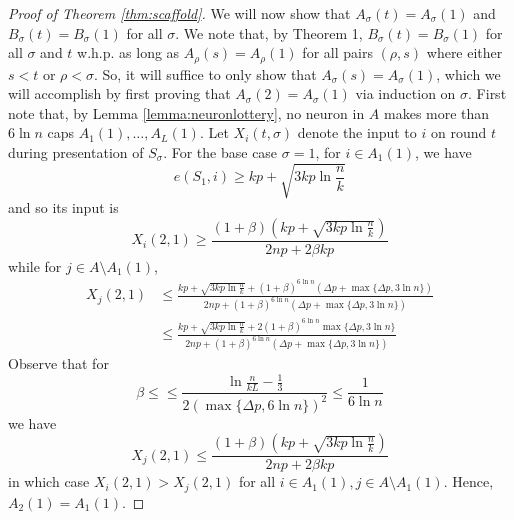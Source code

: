 \documentclass[12pt,nosubfloats]{alt2024} %
\newcommand{\1}{\mathbbm{1}}
\begin{document}
\begin{proof}[Proof of Theorem \ref{thm:scaffold}]
We will now show that $A_\sigma(t) = A_\sigma(1)$ and $B_\sigma(t) = B_\sigma(1)$ for all $\sigma$. We note that, by Theorem 1, $B_\sigma(t) = B_\sigma(1)$ for all $\sigma$ and $t$ w.h.p. as long as $A_\rho(s) = A_\rho(1)$ for all pairs $(\rho, s)$ where either $s < t$ or $\rho < \sigma$. So, it will suffice to only show that $A_\sigma(s) = A_\sigma(1)$, which we will accomplish by first proving that $A_\sigma(2) = A_\sigma(1)$ via induction on $\sigma$. First note that, by Lemma \ref{lemma:neuronlottery}, no neuron in $A$ makes more than $6 \ln n$ caps $A_1(1), \ldots, A_L(1)$. Let $X_i(t, \sigma)$ denote the input to $i$ on round $t$ during presentation of $S_\sigma$. For the base case $\sigma = 1$, for $i \in A_{1}(1)$, we have
\[e(S_1, i) \ge kp + \sqrt{3kp \ln \frac{n}{k}}\]
and so its input is
\[X_i(2, 1) \ge \frac{(1 + \beta)(kp + \sqrt{3kp \ln \frac{n}{k}})}{2np + 2\beta kp}\]
while for $j \in A \setminus A_1(1)$,
\begin{align*}
    X_j(2, 1) &\le \frac{kp + \sqrt{3kp\ln \frac{n}{k}} + (1 + \beta)^{6\ln n}(\Delta p + \max \{\Delta p, 3 \ln n\})}{2np + (1 + \beta)^{6\ln n}(\Delta p + \max \{\Delta p, 3 \ln n\})}\\
    &\le \frac{kp + \sqrt{3kp\ln \frac{n}{k}} + 2(1 + \beta)^{6\ln n}\max \{\Delta p, 3 \ln n\}}{2np + (1 + \beta)^{6\ln n}(\Delta p + \max \{\Delta p, 3 \ln n\})}
\end{align*}
Observe that for
\[\beta \le \le \frac{ \ln \frac{n}{kL} - \frac{1}{3}}{2 (\max \{\Delta p, 6 \ln n\})^2 } \le \frac{1}{6\ln n}\]
we have
\[X_j(2, 1) \le \frac{(1 + \beta)(kp + \sqrt{3kp \ln \frac{n}{k}})}{2np + 2\beta kp}\]
in which case $X_i(2, 1) > X_j(2, 1)$ for all $i \in A_1(1), j \in A \setminus A_1(1)$. Hence, $A_2(1) = A_1(1)$.


\end{proof}
\end{document}

